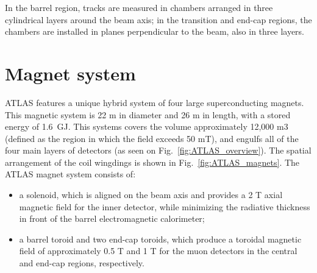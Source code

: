 In the barrel region, tracks are measured in chambers arranged in three cylindrical layers
around the beam axis; in the transition and end-cap regions, the chambers are installed in planes
perpendicular to the beam, also in three layers.


\section{Magnet system}
\label{sec:ATLAS_magnets}

\begin{figure}
\end{figure}


ATLAS features a unique hybrid system of four large superconducting magnets. This magnetic
system is 22 m in diameter and 26 m in length, with a stored energy of 1.6~GJ. This systems covers the volume approximately 12,000 m3 (defined as the region in which the field exceeds 50 mT), and engulfs all of the four main layers of detectors (as seen on Fig.~\ref{fig:ATLAS_overview}). The spatial arrangement of the coil wingdings is shown in Fig.~\ref{fig:ATLAS_magnets}. The ATLAS magnet system consists of:

\begin{itemize}
\item a solenoid, which is aligned on the beam axis and provides a 2 T axial magnetic field for the inner detector, while minimizing the radiative thickness in front of the
barrel electromagnetic calorimeter;
\item a barrel toroid and two end-cap toroids, which produce a
toroidal magnetic field of approximately 0.5 T and 1 T for the muon detectors in the central
and end-cap regions, respectively.
\end{itemize}

